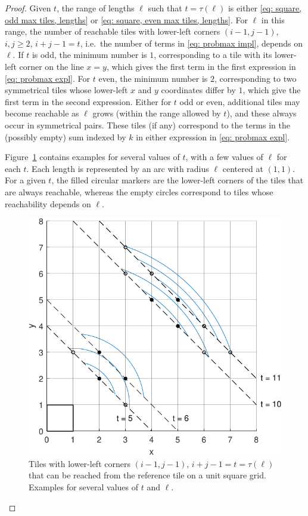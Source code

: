 \documentclass[12pt, a4paper]{article}
\newcommand{\funt}{\tau} %
\newcommand{\len}{\ell} %
\newcommand{\tiles}{t} %
\begin{document}
\begin{proof}
Given $\tiles$, the range of lengths $\len$ such that $\tiles = \funt(\len)$ is either \eqref{eq: square, odd max tiles, lengths} or \eqref{eq: square, even max tiles, lengths}. For $\len$ in this range, the number of reachable tiles with lower-left corners $(i-1,j-1)$, $i,j \geq 2$, $i+j-1=\tiles$, i.e.~the number of terms in \eqref{eq: probmax impl}, depends on $\len$. If $\tiles$ is odd, the minimum number is $1$, corresponding to a tile with its lower-left corner on the line $x=y$, which gives the first term in the first expression in \eqref{eq: probmax expl}. For $\tiles$ even, the minimum number is $2$, corresponding to two symmetrical tiles whose lower-left $x$ and $y$ coordinates differ by $1$, which give the first term in the second expression. Either for $\tiles$ odd or even, additional tiles may become reachable as $\len$ grows (within the range allowed by $\tiles$), and these always occur in symmetrical pairs. These tiles (if any) correspond to the terms in the (possibly empty) sum indexed by $k$ in either expression in \eqref{eq: probmax expl}. 

Figure~\ref{fig: probmax_terms} contains examples for several values of $\tiles$, with a few values of $\len$ for each $\tiles$. Each length is represented by an arc with radius $\len$ centered at $(1,1)$. For a given $\tiles$, the filled circular markers are the lower-left corners of the tiles that are always reachable, whereas the empty circles correspond to tiles whose reachability depends on $\len$.

\begin{figure}
\centering
\includegraphics[width=.7\textwidth]{probmax_terms}%
\caption{Tiles with lower-left corners $(i-1,j-1)$, $i+j-1=\tiles=\funt(\len)$ that can be reached from the reference tile on a unit square grid. Examples for several values of $\tiles$ and $\len$.
}%
\label{fig: probmax_terms}%
\end{figure}%


\end{proof}
\end{document}
